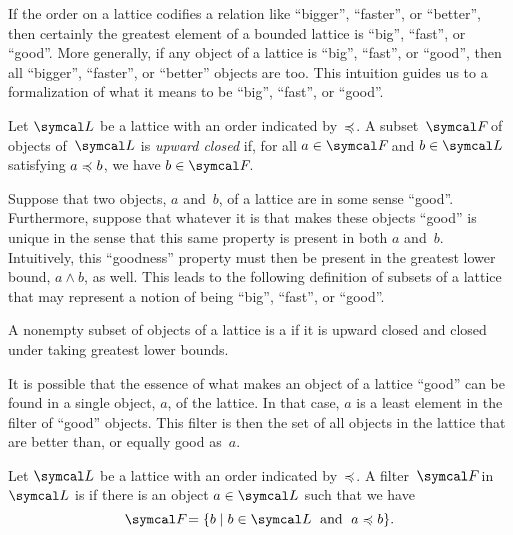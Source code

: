 If the order on a lattice codifies a relation like \enquote{bigger}, \enquote{faster}, or \enquote{better}, then certainly the greatest element of a bounded lattice is \enquote{big}, \enquote{fast}, or \enquote{good}.
More generally, if any object of a lattice is \enquote{big}, \enquote{fast}, or \enquote{good}, then all \enquote{bigger}, \enquote{faster}, or \enquote{better} objects are too.
This intuition guides us to a formalization of what it means to be \enquote{big}, \enquote{fast}, or \enquote{good}.
\begin{definition}
  Let $\calL$ be a lattice with an order indicated by~$\preccurlyeq$.
  A subset~$\calF$ of objects of~$\calL$ is \emph{upward closed} if, for all $a \in \calF$ and $b \in \calL$ satisfying $a \preccurlyeq b$, we have $b \in \calF$.
\end{definition}

Suppose that two objects, $a$ and~$b$, of a lattice are in some sense \enquote{good}.
Furthermore, suppose that whatever it is that makes these objects \enquote{good} is unique in the sense that this same property is present in both $a$ and~$b$.
Intuitively, this \enquote{goodness} property must then be present in the greatest lower bound, $a \land b$, as well.
This leads to the following definition of subsets of a lattice that may represent a notion of being \enquote{big}, \enquote{fast}, or \enquote{good}.
\begin{definition}
  A nonempty subset of objects of a lattice is a  if it is upward closed and closed under taking greatest lower bounds.
\end{definition}

It is possible that the essence of what makes an object of a lattice \enquote{good} can be found in a single object, $a$, of the lattice.
In that case, $a$ is a least element in the filter of \enquote{good} objects.
This filter is then the set of all objects in the lattice that are better than, or equally good as~$a$.
\begin{definition}
  Let $\calL$ be a lattice with an order indicated by~$\preccurlyeq$.
  A filter~$\calF$ in~$\calL$ is  if there is an object $a \in \calL$ such that we have
  \begin{equation*}
    \calF = \{b \st b \in \calL \reland a \quasile b\}.
  \end{equation*}
\end{definition}

